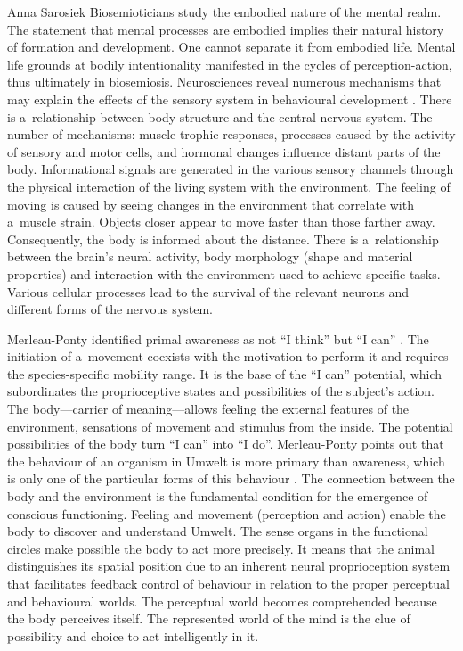 \begin{artengenv}{Anna Sarosiek}
Biosemioticians study the embodied nature of the mental realm. The statement that mental processes are embodied implies their natural history of formation and development. One cannot separate it from embodied life. Mental life grounds at bodily intentionality manifested in the cycles of perception-action, thus ultimately in biosemiosis. Neurosciences reveal numerous mechanisms that may explain the effects of the sensory system in behavioural development
\parencite[][pp.19–20]{purves_body_1988}. %
 There is a~relationship between body structure and the central nervous system. The number of mechanisms: muscle trophic responses, processes caused by the activity of sensory and motor cells, and hormonal changes influence distant parts of the body. Informational signals are generated in the various sensory channels through the physical interaction of the living system with the environment. The feeling of moving is caused by seeing changes in the environment that correlate with a~muscle strain. Objects closer appear to move faster than those farther away. Consequently, the body is informed about the distance. There is a~relationship between the brain’s neural activity, body morphology (shape and material properties) and interaction with the environment used to achieve specific tasks. Various cellular processes lead to the survival of the relevant neurons and different forms of the nervous system.

Merleau-Ponty identified primal awareness as not ``I think'' but ``I can''
\parencite[][p.156]{merleau-ponty_fenomenologia_2001}. %
 The initiation of a~movement coexists with the motivation to perform it and requires the species-specific mobility range. It is the base of the ``I can'' potential, which subordinates the proprioceptive states and possibilities of the subject’s action. The body---carrier of meaning---allows feeling the external features of the environment, sensations of movement and stimulus from the inside. The potential possibilities of the body turn ``I can'' into ``I do''. Merleau-Ponty points out that the behaviour of an organism in Umwelt is more primary than awareness, which is only one of the particular forms of this behaviour 
\parencite[][p.239,393]{merleau-ponty_fenomenologia_2001}. %
 The connection between the body and the environment is the fundamental condition for the emergence of conscious functioning. Feeling and movement (perception and action) enable the body to discover and understand Umwelt. The sense organs in the functional circles make possible the body to act more precisely. It means that the animal distinguishes its spatial position due to an inherent neural proprioception system that facilitates feedback control of behaviour in relation to the proper perceptual and behavioural worlds. The perceptual world becomes comprehended because the body perceives itself. The represented world of the mind is the clue of possibility and choice to act intelligently in it.


\end{artengenv}
